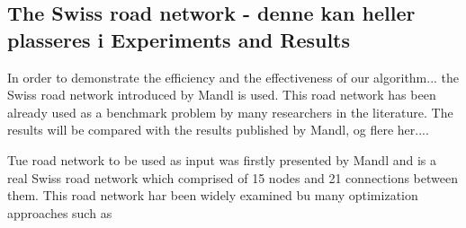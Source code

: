\subsection{The Swiss road network - denne kan heller plasseres i Experiments and Results}
In order to demonstrate the efficiency and the effectiveness of our algorithm... the Swiss road network introduced by Mandl is used. This road network has been already used as a benchmark problem by many researchers in the literature. \citep{kechagiopoulos14}
The results will be compared with the results published by Mandl, og flere her....

Tue road network to be used as input was firstly presented by Mandl and is a real Swiss road network which comprised of 15 nodes and 21 connections between them. This road network har been widely examined bu many optimization approaches such as \citep{kechagiopoulos14}




